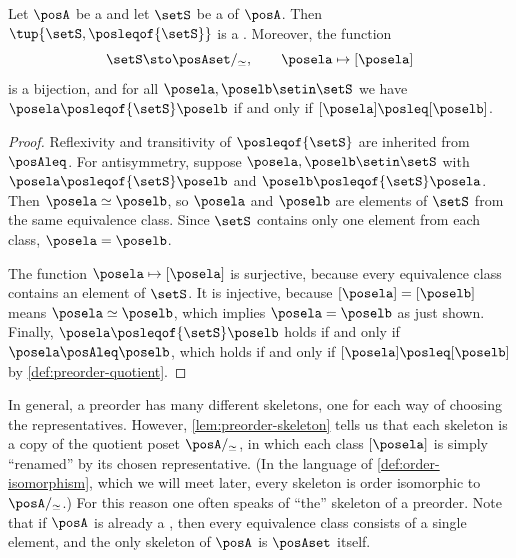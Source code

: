 \begin{lemma}
    \label{lem:preorder-skeleton}
    Let $\posA$ be a  and let $\setS$ be a  of $\posA$.
    Then $\tup{\setS, \posleqof{\setS}}$ is a .
    Moreover, the function
    \begin{equation}
        \setS \sto \posAset/_{\simeq},
        \qquad
        \posela \mapsto [\posela]
    \end{equation}
    is a bijection, and for all $\posela, \poselb \setin \setS$ we have $\posela \posleqof{\setS} \poselb$ if and only if $[\posela] \posleq [\poselb]$.
\end{lemma}
\begin{proof}
    Reflexivity and transitivity of $\posleqof{\setS}$ are inherited from $\posAleq$.
    For antisymmetry, suppose $\posela, \poselb \setin \setS$ with $\posela \posleqof{\setS} \poselb$ and $\poselb \posleqof{\setS} \posela$.
    Then $\posela \simeq \poselb$, so $\posela$ and $\poselb$ are elements of $\setS$ from the same equivalence class.
    Since $\setS$ contains only one element from each class, $\posela = \poselb$.

    The function $\posela \mapsto [\posela]$ is surjective, because every equivalence class contains an element of $\setS$.
    It is injective, because $[\posela] = [\poselb]$ means $\posela \simeq \poselb$, which implies $\posela = \poselb$ as just shown.
    Finally, $\posela \posleqof{\setS} \poselb$ holds if and only if $\posela \posAleq \poselb$, which holds if and only if $[\posela] \posleq [\poselb]$ by \cref{def:preorder-quotient}.
\end{proof}

In general, a preorder has many different skeletons, one for each way of choosing the representatives.
However, \cref{lem:preorder-skeleton} tells us that each skeleton is a copy of the quotient poset $\posA/_{\simeq}$, in which each class $[\posela]$ is simply ``renamed'' by its chosen representative.
(In the language of \cref{def:order-isomorphism}, which we will meet later, every skeleton is order isomorphic to $\posA/_{\simeq}$.)
For this reason one often speaks of ``the'' skeleton of a preorder.
Note that if $\posA$ is already a , then every equivalence class consists of a single element, and the only skeleton of $\posA$ is $\posAset$ itself.

